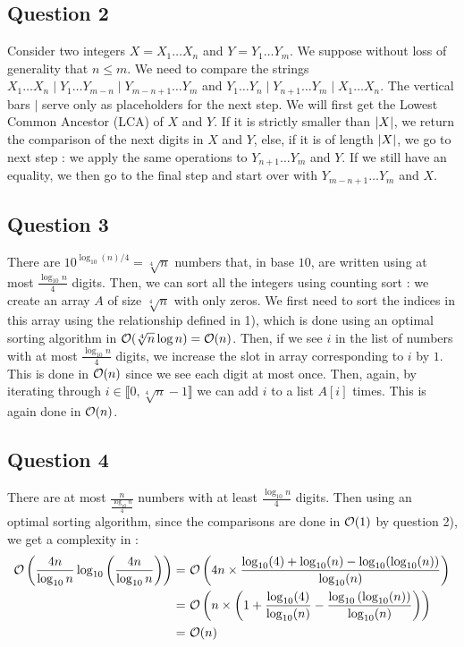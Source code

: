 \documentclass{cours}
\begin{document}
        \subsection{Question 2}
            Consider two integers $X = X_{1}\ldots X_{n}$ and $Y = Y_{1}\ldots Y_{m}$. We suppose without loss of generality that $n \leq m$. We need to compare the strings $X_{1}\ldots X_{n}\mid Y_{1}\ldots Y_{m - n}\mid Y_{m - n + 1}\ldots Y_{m}$ and $Y_{1}\ldots Y_{n}\mid Y_{n + 1}\ldots Y_{m}\mid X_{1}\ldots X_{n}$. The vertical bars $\mid$ serve only as placeholders for the next step. We will first get the Lowest Common Ancestor (LCA) of $X$ and $Y$. If it is strictly smaller than $\left|X\right|$, we return the comparison of the next digits in $X$ and $Y$, else, if it is of length $\left|X\right|$, we go to next step : we apply the same operations to $Y_{n + 1}\ldots Y_{m}$ and $Y$. If we still have an equality, we then go to the final step and start over with $Y_{m - n + 1}\ldots Y_{m}$ and $X$.
        
        \subsection{Question 3}
            There are $10^{\log_{10}(n)/4} = \sqrt[4]{n}$ numbers that, in base $10$, are written using at most $\frac{\log_{10}n}{4}$ digits. Then, we can sort all the integers using counting sort : we create an array $A$ of size $\sqrt[4]{n}$ with only zeros. We first need to sort the indices in this array using the relationship defined in 1), which is done using an optimal sorting algorithm in $\mathcal{O}(\sqrt[4]{n}\log n) = \mathcal{O}(n)$.
            Then, if we see $i$ in the list of numbers with at most $\frac{\log_{10} n}{4}$ digits, we increase the slot in array corresponding to $i$ by $1$. This is done in $\mathcal{O}(n)$ since we see each digit at most once. Then, again, by iterating through $i \in \llbracket 0, \sqrt[4]{n} - 1 \rrbracket$ we can add $i$ to a list $A[i]$ times. This is again done in $\mathcal{O}(n)$.

        \subsection{Question 4}
            There are at most $\frac{n}{\frac{\log_{10} n}{4}}$ numbers with at least $\frac{\log_{10} n}{4}$ digits. Then using an optimal sorting algorithm, since the comparisons are done in $\mathcal{O}(1)$ by question 2), we get a complexity in : 
            \[ 
                \begin{aligned}
                    \mathcal{O}\left(\frac{4n}{\log_{10}n}\log_{10}\left(\frac{4n}{\log_{10}n}\right)\right) = &\ \mathcal{O}\left(4n\times\frac{\log_{10}(4) + \log_{10}(n) - \log_{10}(\log_{10}(n))}{\log_{10}(n)}\right)\\
                    = &\ \mathcal{O}\left(n\times\left(1 + \frac{\log_{10}(4)}{\log_{10}(n)} - \frac{\log_{10}\left(\log_{10}(n)\right)}{\log_{10}(n)}\right)\right)\\
                    = &\ \mathcal{O}(n)
                \end{aligned}
            \]
\end{document}
